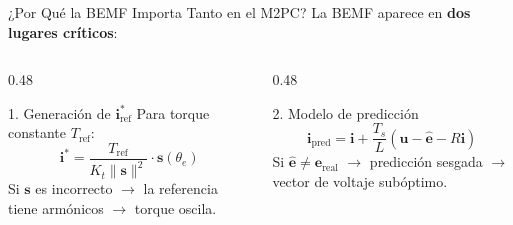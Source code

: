 \begin{frame}{¿Por Qué la BEMF Importa Tanto en el M2PC?}
    La BEMF aparece en \textbf{dos lugares críticos}:
    
    \vspace{0.3cm}
    
    \begin{columns}[T]
    \begin{column}{0.48\textwidth}
        \begin{block}{1. Generación de $\mathbf{i}^*_{\text{ref}}$}
            Para torque constante $T_{\text{ref}}$:
            \begin{equation}
                \mathbf{i}^* = \frac{T_{\text{ref}}}{K_t \|\mathbf{s}\|^2} \cdot \mathbf{s}(\theta_e)
            \end{equation}
            Si $\mathbf{s}$ es incorrecto $\rightarrow$ la referencia tiene armónicos $\rightarrow$ torque oscila.
        \end{block}
    \end{column}
    \begin{column}{0.48\textwidth}
        \begin{block}{2. Modelo de predicción}
            \begin{equation}
                \mathbf{i}_{\text{pred}} = \mathbf{i} + \frac{T_s}{L}(\mathbf{u} - \hat{\mathbf{e}} - R\mathbf{i})
            \end{equation}
            Si $\hat{\mathbf{e}} \neq \mathbf{e}_{\text{real}}$ $\rightarrow$ predicción sesgada $\rightarrow$ vector de voltaje subóptimo.
        \end{block}
    \end{column}
    \end{columns}
    
    \vspace{0.5cm}
    
    \begin{center}
    \end{center}
\end{frame}